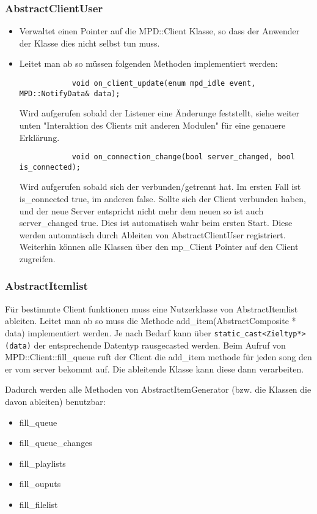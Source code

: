 \subsubsection{AbstractClientUser}
\begin{itemize}
    \item Verwaltet einen Pointer auf die MPD::Client Klasse,
        so dass der Anwender der Klasse dies nicht selbst tun muss.
    \item Leitet man ab so müssen folgenden Methoden implementiert werden:
        \begin{verbatim}
            void on_client_update(enum mpd_idle event, MPD::NotifyData& data);
        \end{verbatim}  

        Wird aufgerufen sobald der Listener eine Änderunge feststellt,
        siehe weiter unten "Interaktion des Clients mit anderen Modulen" für eine genauere Erklärung.
        \begin{verbatim}
            void on_connection_change(bool server_changed, bool is_connected);
        \end{verbatim}

        Wird aufgerufen sobald sich der verbunden/getrennt hat. Im ersten Fall
        ist is\_connected true, im anderen false. Sollte sich der Client verbunden haben,
        und der neue Server entspricht nicht mehr dem neuen so ist auch server\_changed true.
        Dies ist automatisch wahr beim ersten Start.
        Diese werden automatisch durch Ableiten von AbstractClientUser registriert.
        Weiterhin können alle Klassen über den mp\_Client Pointer auf den Client zugreifen.
\end{itemize}


\subsubsection{AbstractItemlist}
Für bestimmte Client funktionen muss eine Nutzerklasse von AbstractItemlist ableiten.
Leitet man ab so muss die Methode add\_item(AbstractComposite * data) implementiert werden. 
Je nach Bedarf kann über \verb+static_cast<Zieltyp*>(data)+ der entsprechende Datentyp rausgecasted werden.
Beim Aufruf von MPD::Client::fill\_queue ruft der Client die add\_item methode für jeden 
song den er vom server bekommt auf. Die ableitende Klasse kann diese dann verarbeiten.

Dadurch werden alle Methoden von AbstractItemGenerator (bzw. die Klassen die davon ableiten) benutzbar:
\begin{itemize}
    \item fill\_queue
    \item fill\_queue\_changes
    \item fill\_playlists
    \item fill\_ouputs
    \item fill\_filelist
\end{itemize} 

